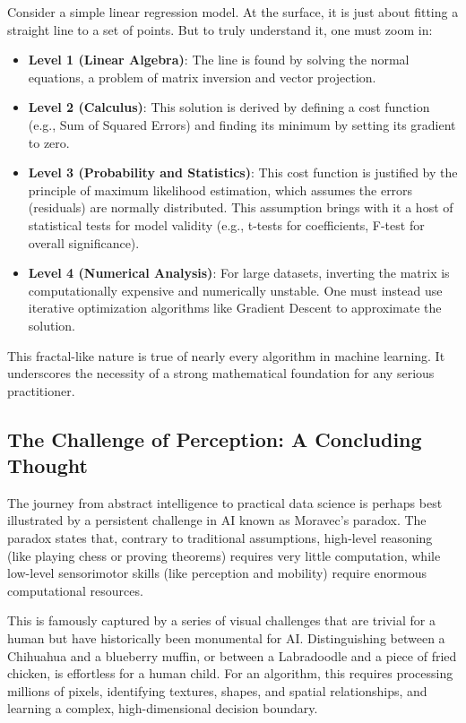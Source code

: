 Consider a simple linear regression model. At the surface, it is just about fitting a straight line to a set of points. But to truly understand it, one must zoom in:
\begin{itemize}
    \item \textbf{Level 1 (Linear Algebra)}: The line is found by solving the normal equations, a problem of matrix inversion and vector projection.
    \item \textbf{Level 2 (Calculus)}: This solution is derived by defining a cost function (e.g., Sum of Squared Errors) and finding its minimum by setting its gradient to zero.
    \item \textbf{Level 3 (Probability and Statistics)}: This cost function is justified by the principle of maximum likelihood estimation, which assumes the errors (residuals) are normally distributed. This assumption brings with it a host of statistical tests for model validity (e.g., t-tests for coefficients, F-test for overall significance).
    \item \textbf{Level 4 (Numerical Analysis)}: For large datasets, inverting the matrix is computationally expensive and numerically unstable. One must instead use iterative optimization algorithms like Gradient Descent to approximate the solution.
\end{itemize}
This fractal-like nature is true of nearly every algorithm in machine learning. It underscores the necessity of a strong mathematical foundation for any serious practitioner.

\subsection*{The Challenge of Perception: A Concluding Thought}
The journey from abstract intelligence to practical data science is perhaps best illustrated by a persistent challenge in AI known as Moravec's paradox. The paradox states that, contrary to traditional assumptions, high-level reasoning (like playing chess or proving theorems) requires very little computation, while low-level sensorimotor skills (like perception and mobility) require enormous computational resources.

This is famously captured by a series of visual challenges that are trivial for a human but have historically been monumental for AI. Distinguishing between a Chihuahua and a blueberry muffin, or between a Labradoodle and a piece of fried chicken, is effortless for a human child. For an algorithm, this requires processing millions of pixels, identifying textures, shapes, and spatial relationships, and learning a complex, high-dimensional decision boundary.

